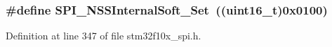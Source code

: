 \subsubsection[{\texorpdfstring{S\+P\+I\+\_\+\+N\+S\+S\+Internal\+Soft\+\_\+\+Set}{SPI_NSSInternalSoft_Set}}]{\setlength{\rightskip}{0pt plus 5cm}\#define S\+P\+I\+\_\+\+N\+S\+S\+Internal\+Soft\+\_\+\+Set~(({\bf uint16\+\_\+t})0x0100)}\hypertarget{group___s_p_i___n_s_s__internal__software__management_ga6b2102816167d12140648dba49a192a7}{}\label{group___s_p_i___n_s_s__internal__software__management_ga6b2102816167d12140648dba49a192a7}


Definition at line 347 of file stm32f10x\+\_\+spi.\+h.

